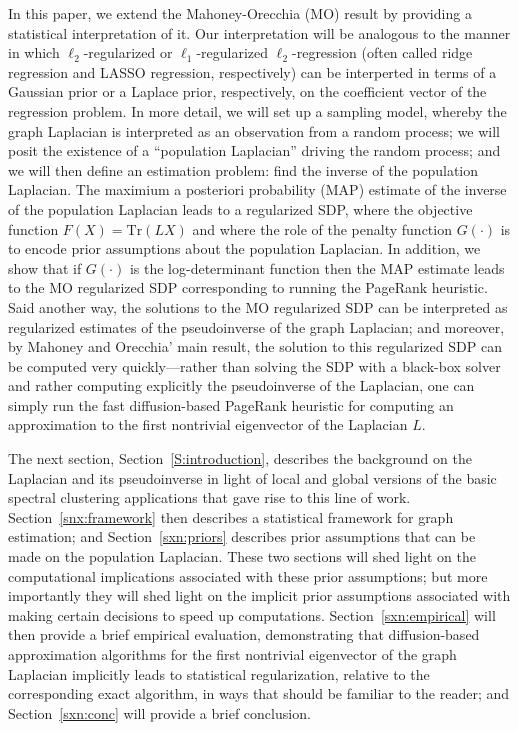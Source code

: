 \documentclass[12pt]{article}
\theoremstyle{plain}
\begin{document}
In this paper, we extend the Mahoney-Orecchia (MO) result by providing a
statistical interpretation of it.
Our interpretation will be analogous to the manner in which
$\ell_2$-regularized or $\ell_1$-regularized $\ell_2$-regression (often
called ridge regression and LASSO regression, respectively) can be
interperted in terms of a Gaussian prior or a Laplace prior, respectively,
on the coefficient vector of the regression problem.
In more detail, we will set up a sampling model, whereby the graph Laplacian
is interpreted as an observation from a random process; we will posit the
existence of a ``population Laplacian'' driving the random process; and we
will then define an estimation problem: find the inverse of the population
Laplacian.
The maximium a posteriori probability (MAP) estimate of the inverse of the
population Laplacian leads to a regularized SDP, where the objective
function $F(X)=\mathrm{Tr}(L X)$ and where the role of the penalty function
$G(\cdot)$ is to encode prior assumptions about the population Laplacian.
In addition, we show that if $G(\cdot)$ is the log-determinant function then
the MAP estimate leads to the MO regularized SDP corresponding to running
the PageRank heuristic.
Said another way, the solutions to the MO regularized SDP can be interpreted
as regularized estimates of the pseudoinverse of the graph Laplacian; and
moreover, by Mahoney and Orecchia' main result, the solution to this 
regularized SDP can be computed very quickly---rather than solving the SDP 
with a black-box solver and rather computing explicitly the pseudoinverse 
of the Laplacian, one can simply run the fast diffusion-based PageRank 
heuristic for computing an approximation to the first nontrivial eigenvector 
of the Laplacian $L$.

The next section, Section~\ref{S:introduction}, describes the background on
the Laplacian and its pseudoinverse in light of local and global versions of
the basic spectral clustering applications that gave rise to this line of
work.
Section~\ref{snx:framework} then describes a statistical framework for graph
estimation; and Section~\ref{sxn:priors} describes prior assumptions that
can be made on the population Laplacian.
These two sections will shed light on the computational implications
associated with these prior assumptions; but more importantly they will shed
light on the implicit prior assumptions associated with making certain
decisions to speed up computations.
Section~\ref{sxn:empirical} will then provide a brief empirical evaluation,
demonstrating that diffusion-based approximation algorithms for the first 
nontrivial eigenvector of the graph Laplacian implicitly leads to 
statistical regularization, relative to the corresponding exact algorithm, 
in ways that should be familiar to the reader; and Section~\ref{sxn:conc} 
will provide a brief conclusion.
\end{document}
